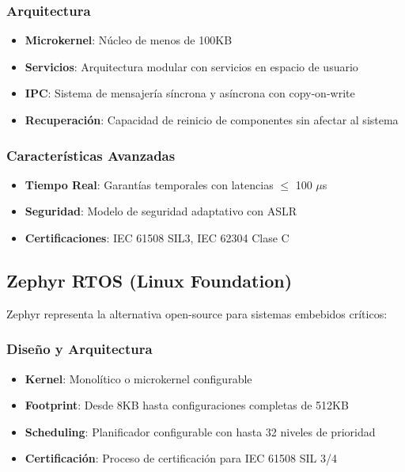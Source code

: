        \subsubsection{Arquitectura}
            \begin{itemize}
                \item \textbf{Microkernel}: Núcleo de menos de 100KB
                \item \textbf{Servicios}: Arquitectura modular con servicios en espacio de usuario
                \item \textbf{IPC}: Sistema de mensajería síncrona y asíncrona con copy-on-write
                \item \textbf{Recuperación}: Capacidad de reinicio de componentes sin afectar al sistema
            \end{itemize}

        \subsubsection{Características Avanzadas}
            \begin{itemize}
                \item \textbf{Tiempo Real}: Garantías temporales con latencias $\le$ 100 $\mu$s
                \item \textbf{Seguridad}: Modelo de seguridad adaptativo con ASLR
                \item \textbf{Certificaciones}: IEC 61508 SIL3, IEC 62304 Clase C
            \end{itemize}

    \newpage
    \subsection{Zephyr RTOS (Linux Foundation)}
        Zephyr representa la alternativa open-source para sistemas embebidos críticos:

        \subsubsection{Diseño y Arquitectura}
            \begin{itemize}
                \item \textbf{Kernel}: Monolítico o microkernel configurable
                \item \textbf{Footprint}: Desde 8KB hasta configuraciones completas de 512KB
                \item \textbf{Scheduling}: Planificador configurable con hasta 32 niveles de prioridad
                \item \textbf{Certificación}: Proceso de certificación para IEC 61508 SIL 3/4
            \end{itemize}

